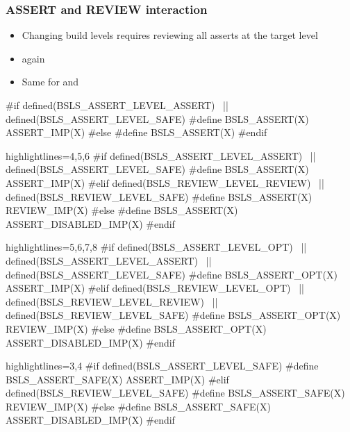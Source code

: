 \begin{frame}[fragile]
  \frametitle{ASSERT and REVIEW interaction}
  
  \begin{itemize}
  \item<1-> Changing build levels requires reviewing all asserts at the target level
  \item<2->  again
  \item<4-> Same for  and 
  \end{itemize}

\begin{overprint}
\begin{cppcodebox}
#if defined(BSLS_ASSERT_LEVEL_ASSERT) \
 || defined(BSLS_ASSERT_LEVEL_SAFE)
#define BSLS_ASSERT(X) ASSERT_IMP(X)
#else
#define BSLS_ASSERT(X)
#endif
\end{cppcodebox}

\begin{cppcodebox*}{highlightlines={4,5,6}}
#if defined(BSLS_ASSERT_LEVEL_ASSERT)  \
 || defined(BSLS_ASSERT_LEVEL_SAFE)
#define BSLS_ASSERT(X) ASSERT_IMP(X)
#elif defined(BSLS_REVIEW_LEVEL_REVIEW) \
   || defined(BSLS_REVIEW_LEVEL_SAFE)
#define BSLS_ASSERT(X) REVIEW_IMP(X)  
#else
#define BSLS_ASSERT(X) ASSERT_DISABLED_IMP(X)
#endif
\end{cppcodebox*}
      
\begin{cppcodebox*}{highlightlines={5,6,7,8}}
#if defined(BSLS_ASSERT_LEVEL_OPT)    \
 || defined(BSLS_ASSERT_LEVEL_ASSERT) \
 || defined(BSLS_ASSERT_LEVEL_SAFE)
#define BSLS_ASSERT_OPT(X) ASSERT_IMP(X)
#elif defined(BSLS_REVIEW_LEVEL_OPT)  \
 || defined(BSLS_REVIEW_LEVEL_REVIEW) \
 || defined(BSLS_REVIEW_LEVEL_SAFE)
#define BSLS_ASSERT_OPT(X) REVIEW_IMP(X)  
#else
#define BSLS_ASSERT_OPT(X) ASSERT_DISABLED_IMP(X)
#endif
\end{cppcodebox*}
      
\onslide<5>
\begin{cppcodebox*}{highlightlines={3,4}}
#if defined(BSLS_ASSERT_LEVEL_SAFE)
#define BSLS_ASSERT_SAFE(X) ASSERT_IMP(X)
#elif defined(BSLS_REVIEW_LEVEL_SAFE)
#define BSLS_ASSERT_SAFE(X) REVIEW_IMP(X)  
#else
#define BSLS_ASSERT_SAFE(X) ASSERT_DISABLED_IMP(X)
#endif
\end{cppcodebox*}
      
\end{overprint}
\end{frame}

